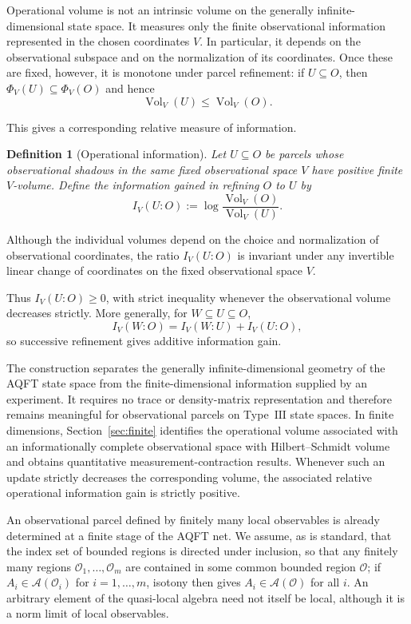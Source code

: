 \documentclass[11pt]{article}
\newtheorem{definition}[theorem]{Definition}
\newcommand{\A}{\mathcal{A}}
\begin{document}
Operational volume is not an intrinsic volume on the generally
infinite-dimensional state space. It measures only the finite
observational information represented in the chosen coordinates $V$.
In particular, it depends on the observational subspace and on the
normalization of its coordinates. Once these are fixed, however, it is
monotone under parcel refinement: if $U\subseteq O$, then
$\Phi_V(U)\subseteq\Phi_V(O)$ and hence
\[
\operatorname{Vol}_V(U)
\leq
\operatorname{Vol}_V(O).
\]

This gives a corresponding relative measure of information.

\begin{definition}[Operational information]
\label{def:operational-information}
Let $U\subseteq O$ be parcels whose observational shadows in the same
fixed observational space $V$ have positive finite $V$-volume. Define the information gained in refining $O$ to $U$
by
\[
I_V(U:O)
:=
\log
\frac{\operatorname{Vol}_V(O)}
     {\operatorname{Vol}_V(U)}.
\]
\end{definition}

Although the individual volumes depend on the choice and normalization
of observational coordinates, the ratio $I_V(U:O)$ is invariant under
any invertible linear change of coordinates on the fixed observational
space $V$.

Thus $I_V(U:O)\geq0$, with strict inequality whenever the observational
volume decreases strictly. More generally, for
$W\subseteq U\subseteq O$,
\[
I_V(W:O)
=
I_V(W:U)+I_V(U:O),
\]
so successive refinement gives additive information gain.

The construction separates the generally infinite-dimensional geometry
of the AQFT state space from the finite-dimensional information supplied
by an experiment. It requires no trace or density-matrix representation
and therefore remains meaningful for observational parcels on
Type~$\mathrm{III}$ state spaces. In finite dimensions, Section~\ref{sec:finite} identifies the
operational volume associated with an informationally complete
observational space with Hilbert--Schmidt volume and obtains quantitative
measurement-contraction results. Whenever such an update strictly
decreases the corresponding volume, the associated relative operational
information gain is strictly positive.

An observational parcel defined by finitely many local observables is
already determined at a finite stage of the AQFT net. We assume, as is standard, that the
index set of bounded regions is directed under inclusion, so that any
finitely many regions $\mathcal O_1,\ldots,\mathcal O_m$ are contained in
some common bounded region $\mathcal O$; if $A_i\in\A(\mathcal O_i)$ for
$i=1,\ldots,m$, isotony then gives $A_i\in\A(\mathcal O)$ for all $i$. An
arbitrary element of the quasi-local algebra need not itself be local,
although it is a norm limit of local observables.
\end{document}
